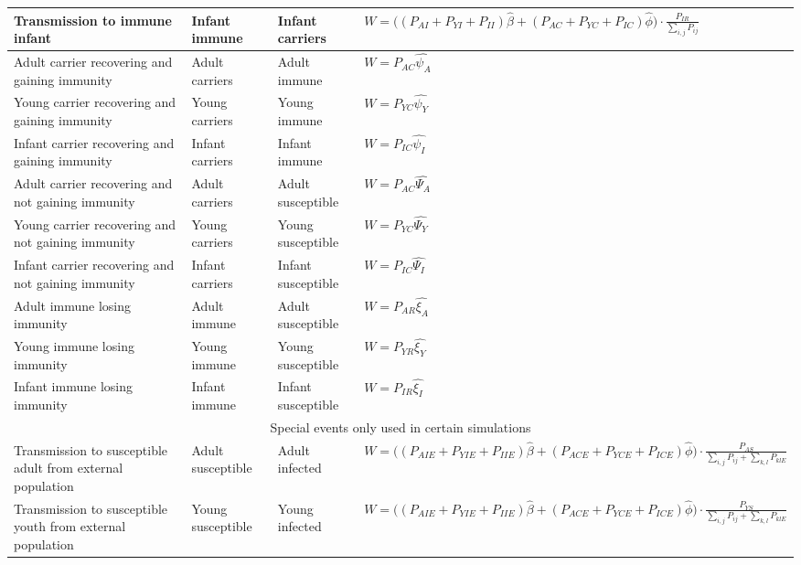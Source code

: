 \documentclass[10pt,a4paper]{article}
\begin{document}
\begin{appendices}
\begin{longtable}{p{3.5cm}|l|l|p{4cm}}
	Transmission to immune infant		& Infant immune			& Infant carriers			&
				$W = \big( \left( P_{AI} + P_{YI} + P_{II} \right)\hat{\beta} + \left( P_{AC} + P_{YC} + P_{IC} \right) \hat{\phi} \big) \cdot \frac{P_{IR}}{\sum_{i,j}P_{ij}}$																																																	\\ \hline
	Adult carrier recovering and gaining immunity	& Adult carriers		& Adult immune				& $W = P_{AC} \hat{\psi_A}$									\\ \hline
	Young carrier recovering and gaining immunity	& Young carriers		& Young immune				& $W = P_{YC} \hat{\psi_Y}$									\\ \hline
	Infant carrier recovering and gaining immunity	& Infant carriers		& Infant immune				& $W = P_{IC} \hat{\psi_I}$									\\ \hline
	Adult carrier recovering and not gaining immunity	& Adult carriers		& Adult susceptible			& $W = P_{AC} \hat{\Psi_A}$								\\ \hline
	Young carrier recovering and not gaining immunity	& Young carriers		& Young susceptible			& $W = P_{YC} \hat{\Psi_Y}$								\\ \hline
	Infant carrier recovering and not gaining immunity	& Infant carriers		& Infant susceptible		& $W = P_{IC} \hat{\Psi_I}$								\\ \hline
	Adult immune losing immunity		& Adult immune			& Adult susceptible			& $W = P_{AR} \hat{\xi_A}$												\\ \hline
	Young immune losing immunity		& Young immune			& Young susceptible			& $W = P_{YR} \hat{\xi_Y}$												\\ \hline
	Infant immune losing immunity		& Infant immune			& Infant susceptible		& $W = P_{IR} \hat{\xi_I}$												\\ \hline \hline
	\multicolumn{4}{c}{Special events only used in certain simulations} \\ \hline \hline
	Transmission to susceptible adult from external population		& Adult susceptible		& Adult infected	&
				$W = \big( \left( P_{AIE} + P_{YIE} + P_{IIE}\right) \hat{\beta} + \left( P_{ACE} + P_{YCE} + P_{ICE} \right) \hat{\phi} \big) \cdot \frac{P_{AS}}{\sum_{i,j}P_{ij} + \sum_{k,l} P_{klE}}$
																																									\\ \hline
	Transmission to susceptible youth from external population		& Young susceptible		& Young infected	&
				$W = \big( \left( P_{AIE} + P_{YIE} + P_{IIE}\right) \hat{\beta} + \left( P_{ACE} + P_{YCE} + P_{ICE} \right) \hat{\phi} \big) \cdot \frac{P_{YS}}{\sum_{i,j}P_{ij} + \sum_{k,l} P_{klE}}$

\end{longtable}
\end{appendices}
\end{document}
